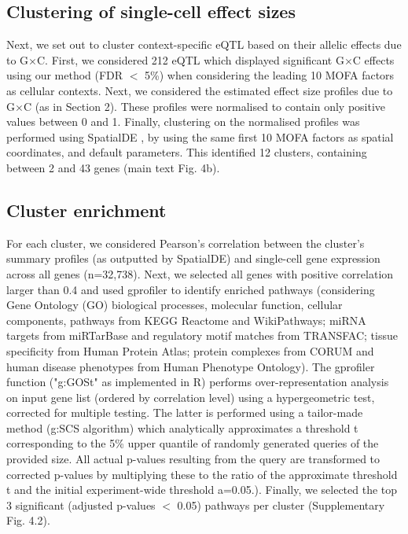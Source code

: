 \subsection{Clustering of single-cell effect sizes}

Next, we set out to cluster context-specific eQTL based on their allelic effects due to G$\times$C.
First, we considered 212 eQTL which displayed significant G$\times$C effects using our method (FDR $<$ 5\%) when considering the leading 10 MOFA factors as cellular contexts.
Next, we considered the estimated effect size profiles due to G$\times$C (as in Section 2).
These profiles were normalised to contain only positive values between 0 and 1.
Finally, clustering on the normalised profiles was performed using SpatialDE \cite{svensson2018spatialde}, by using the same first 10 MOFA factors as spatial coordinates, and default parameters. 
This identified 12 clusters, containing between 2 and 43 genes (main text Fig. 4b).

\subsection{Cluster enrichment}

For each cluster, we considered Pearson's correlation between the cluster's summary profiles (as outputted by SpatialDE) and single-cell gene expression across all genes (n=32,738).
Next, we selected all genes with positive correlation larger than 0.4 and used gprofiler \cite{raudvere2019g} to identify enriched pathways (considering Gene Ontology (GO) biological processes, molecular function, cellular components, pathways from KEGG Reactome and WikiPathways; miRNA targets from miRTarBase and regulatory motif matches from TRANSFAC; tissue specificity from Human Protein Atlas; protein complexes from CORUM and human disease phenotypes from Human Phenotype Ontology). 
The gprofiler function ("g:GOSt" as implemented in R) performs over-representation analysis on input gene list (ordered by correlation level) using a hypergeometric test, corrected for multiple testing.
The latter is performed using a tailor-made method (g:SCS algorithm) which analytically approximates a threshold t corresponding to the 5\% upper quantile of randomly generated queries of the provided size. 
All actual p-values resulting from the query are transformed to corrected p-values by multiplying these to the ratio of the approximate threshold t and the initial experiment-wide threshold a=0.05.).
Finally, we selected the top 3 significant (adjusted p-values $<$ 0.05) pathways per cluster (Supplementary Fig. 4.2). 